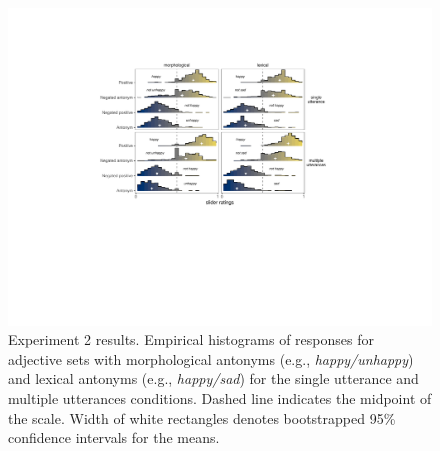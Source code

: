 \documentclass[floatsintext,doc]{apa6}
\begin{document}
\begin{figure}[t]
\centering \includegraphics[width=0.95\linewidth]{figs/expt2_directlabel_hist} 
\caption{Experiment 2 results. Empirical histograms of responses for adjective sets with morphological antonyms (e.g., \emph{happy/unhappy}) and lexical antonyms (e.g., \emph{happy/sad}) for the single utterance and multiple utterances conditions. Dashed line indicates the midpoint of the scale. Width of white rectangles denotes bootstrapped 95\% confidence intervals for the means.}
\label{fig:expt2-results}
\end{figure}
\end{document}

